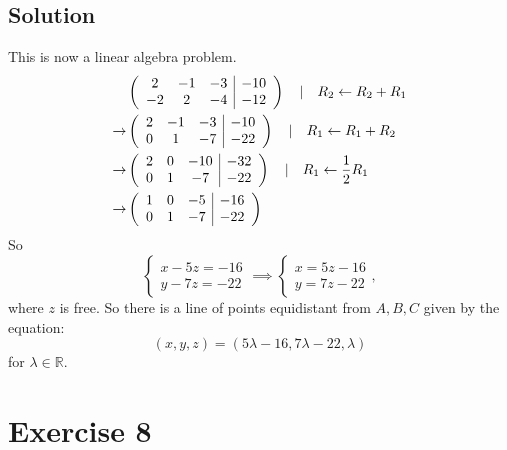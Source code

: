 \documentclass[a4paper,10pt]{article}
\begin{document}
\subsection{Solution}
This is now a linear algebra problem.
\begin{align*}
     & \left(
    \begin{array}{c c c|c}
            2  & -1 & -3 & -10 \\
            -2 & 2  & -4 & -12 \\
        \end{array}
    \right) \quad | \quad R_2 \leftarrow R_2 + R_1       \\ \rightarrow
     & \left(
    \begin{array}{c c c|c}
            2 & -1 & -3 & -10 \\
            0 & 1  & -7 & -22 \\
        \end{array}
    \right) \quad | \quad R_1 \leftarrow R_1 + R_2       \\ \rightarrow
     & \left(
    \begin{array}{c c c|c}
            2 & 0 & -10 & -32 \\
            0 & 1 & -7  & -22 \\
        \end{array}
    \right) \quad | \quad R_1 \leftarrow \frac{1}{2} R_1 \\ \rightarrow
     & \left(
    \begin{array}{c c c|c}
            1 & 0 & -5 & -16 \\
            0 & 1 & -7 & -22 \\
        \end{array}
    \right)
\end{align*}
So
\[
    \begin{cases}
        x - 5z = -16 \\
        y - 7z = -22
    \end{cases} \implies \begin{cases}
        x = 5z - 16 \\
        y = 7z - 22
    \end{cases},
\]
where $z$ is free. So there is a line of points equidistant from $A, B, C$ given by the equation:
\[
    (x, y, z) = (5\lambda - 16, 7\lambda - 22, \lambda)
\]
for $\lambda\in\mathbb{R}$.

\clearpage

\section{Exercise 8}
\end{document}

